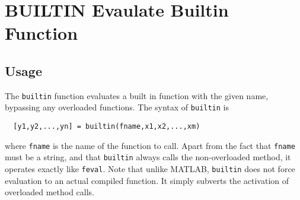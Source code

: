 \section{BUILTIN Evaulate Builtin Function}

\subsection{Usage}

The \verb|builtin| function evaluates a built in function
with the given name, bypassing any overloaded functions.
The syntax of \verb|builtin| is
\begin{verbatim}
  [y1,y2,...,yn] = builtin(fname,x1,x2,...,xm)
\end{verbatim}
where \verb|fname| is the name of the function to call.  Apart
from the fact that \verb|fname| must be a string, and that \verb|builtin|
always calls the non-overloaded method, it operates exactly like
\verb|feval|.  Note that unlike MATLAB, \verb|builtin| does not force
evaluation to an actual compiled function.  It simply subverts
the activation of overloaded method calls.

